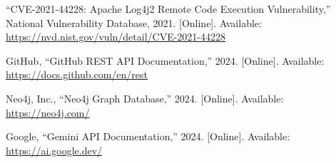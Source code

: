 ﻿\documentclass[conference]{IEEEtran}
\begin{document}
\begin{thebibliography}{00}
 ``CVE-2021-44228: Apache Log4j2 Remote Code Execution Vulnerability,'' National Vulnerability Database, 2021. [Online]. Available: \url{https://nvd.nist.gov/vuln/detail/CVE-2021-44228}

 GitHub, ``GitHub REST API Documentation,'' 2024. [Online]. Available: \url{https://docs.github.com/en/rest}

 Neo4j, Inc., ``Neo4j Graph Database,'' 2024. [Online]. Available: \url{https://neo4j.com/}

 Google, ``Gemini API Documentation,'' 2024. [Online]. Available: \url{https://ai.google.dev/}

\end{thebibliography}
\end{document}
